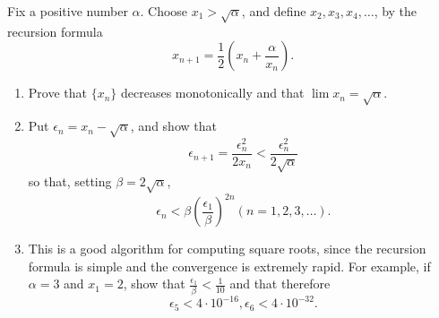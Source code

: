 \setcounter{problem}{15}
\begin{problem}
  Fix a positive number $\alpha$.
  Choose $x_1 > \sqrt{\alpha}$, and define $x_2, x_3, x_4, \ldots$, by the recursion formula
  \[x_{n + 1} = \frac{1}{2} (x_n + \frac{\alpha}{x_n}).\]
  \begin{enumerate}[label=(\alph*)]
    \item Prove that $\{x_n\}$ decreases monotonically and that $\lim x_n = \sqrt{\alpha}$.
    \item Put $\epsilon_n = x_n - \sqrt{\alpha}$, and show that
      \[\epsilon_{n + 1} = \frac{\epsilon_n^2}{2x_n} < \frac{\epsilon_n^2}{2\sqrt{\alpha}}\]
      so that, setting $\beta = 2\sqrt{\alpha}$,
      \[\epsilon_n < \beta (\frac{\epsilon_1}{\beta})^{2n}  (n = 1, 2, 3, \ldots).\]
    \item This is a good algorithm for computing square roots, since the recursion formula is simple and the convergence is extremely rapid.
      For example, if $\alpha = 3$ and $x_1 = 2$, show that $\frac{\epsilon_1}{\beta} < \frac{1}{10}$ and that therefore
      \[\epsilon_5 < 4 \cdot 10^{-16},  \epsilon_6 < 4 \cdot 10^{-32}.\]
  \end{enumerate}
\end{problem}

